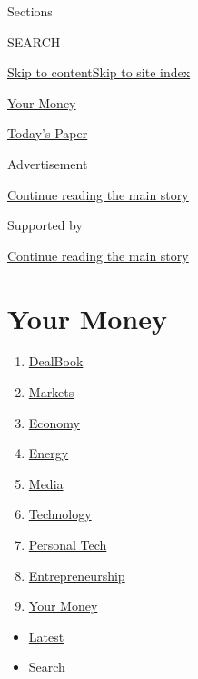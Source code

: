 Sections

SEARCH

\protect\hyperlink{site-content}{Skip to
content}\protect\hyperlink{site-index}{Skip to site index}

\href{https://www.nytimes.com/section/your-money}{Your Money}

\href{https://myaccount.nytimes.com/auth/login?response_type=cookie\&client_id=vi}{}

\href{https://www.nytimes.com/section/todayspaper}{Today's Paper}

Advertisement

\protect\hyperlink{after-top}{Continue reading the main story}

Supported by

\protect\hyperlink{after-sponsor}{Continue reading the main story}

\hypertarget{your-money}{%
\section{Your Money}\label{your-money}}

\begin{enumerate}
\def\labelenumi{\arabic{enumi}.}
\tightlist
\item
  \href{/pages/business/dealbook/index.html}{DealBook}
\item
  \href{https://markets.on.nytimes.com}{Markets}
\item
  \href{/section/business/economy}{Economy}
\item
  \href{/section/business/energy-environment}{Energy}
\item
  \href{/section/business/media}{Media}
\item
  \href{/section/technology}{Technology}
\item
  \href{/section/technology/personaltech}{Personal Tech}
\item
  \href{/section/business/smallbusiness}{Entrepreneurship}
\item
  \href{/section/your-money}{Your Money}
\end{enumerate}

\begin{itemize}
\tightlist
\item
  \protect\hyperlink{stream-panel}{Latest}
\item
  Search
\end{itemize}


